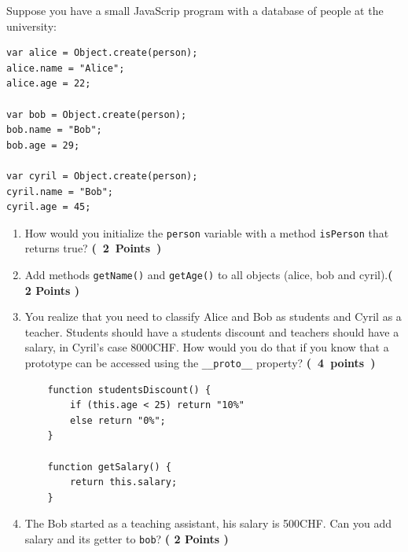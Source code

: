 \documentclass [11pt, a4wide, twoside]{article}
\begin{document}
\noindent Suppose you have a small JavaScrip program with a database of people at the university:
\begin{verbatim}
var alice = Object.create(person);
alice.name = "Alice";
alice.age = 22;

var bob = Object.create(person);
bob.name = "Bob";
bob.age = 29;

var cyril = Object.create(person);
cyril.name = "Bob";
cyril.age = 45;
\end{verbatim}


\begin{enumerate}
        \item How would you initialize the \texttt{person} variable with a method \texttt{isPerson} that returns true? \textbf{(~2~Points~)}
        \vspace{5cm}
        \solution{}

        \item Add methods \texttt{getName()} and \texttt{getAge()} to all objects (alice, bob and cyril).\textbf{( 2 Points )}
        \vspace{5cm}
        \solution{}
	\newpage
        \item You realize that you need to classify Alice and Bob as students and Cyril as a teacher. 
        Students should have a students discount and teachers should have a salary, in Cyril's case 8000CHF.
        How would you do that if you know that a prototype can be accessed using the \texttt{\_\_proto\_\_} property? \textbf{(~4~points~)}

    \begin{verbatim}
    function studentsDiscount() {
        if (this.age < 25) return "10%"
        else return "0%";
    }

    function getSalary() {
        return this.salary;
    }
    \end{verbatim}
        \vspace{7cm}

        \solution{}

        \item The Bob started as a teaching assistant, his salary is 500CHF. Can you add salary and its getter to \texttt{bob}? \textbf{( 2 Points )}
    \vspace{5cm}

    \solution{}


\end{enumerate}
\newpage
{}
\end{document}
